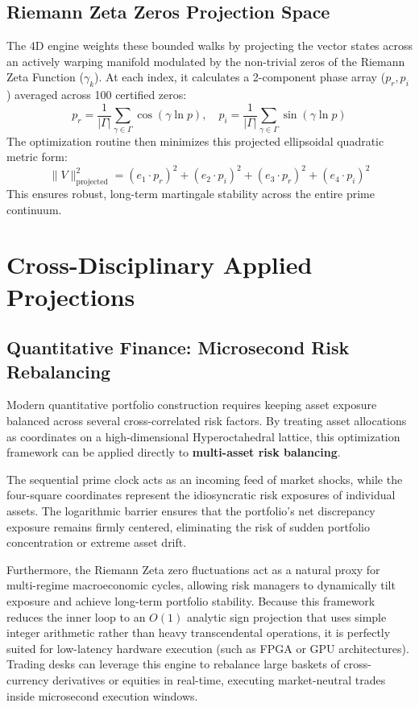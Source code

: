 \documentclass[11pt,a4paper]{article}
\begin{document}
\subsection{Riemann Zeta Zeros Projection Space}
The 4D engine weights these bounded walks by projecting the vector states across an actively warping manifold modulated by the non-trivial zeros of the Riemann Zeta Function ($\gamma_k$). At each index, it calculates a 2-component phase array ($p_{r}, p_{i}$) averaged across 100 certified zeros:
\begin{equation}
p_r = \frac{1}{|\Gamma|} \sum_{\gamma \in \Gamma} \cos(\gamma \ln p), \quad p_i = \frac{1}{|\Gamma|} \sum_{\gamma \in \Gamma} \sin(\gamma \ln p)
\end{equation}
The optimization routine then minimizes this projected ellipsoidal quadratic metric form:
\begin{equation}
\|V\|_{\text{projected}}^2 = (e_1 \cdot p_r)^2 + (e_2 \cdot p_i)^2 + (e_3 \cdot p_r)^2 + (e_4 \cdot p_i)^2
\end{equation}
This ensures robust, long-term martingale stability across the entire prime continuum.

\section{Cross-Disciplinary Applied Projections}

\subsection{Quantitative Finance: Microsecond Risk Rebalancing}
Modern quantitative portfolio construction requires keeping asset exposure balanced across several cross-correlated risk factors. By treating asset allocations as coordinates on a high-dimensional Hyperoctahedral lattice, this optimization framework can be applied directly to \textbf{multi-asset risk balancing}. 

The sequential prime clock acts as an incoming feed of market shocks, while the four-square coordinates represent the idiosyncratic risk exposures of individual assets. The logarithmic barrier ensures that the portfolio's net discrepancy exposure remains firmly centered, eliminating the risk of sudden portfolio concentration or extreme asset drift. 

Furthermore, the Riemann Zeta zero fluctuations act as a natural proxy for multi-regime macroeconomic cycles, allowing risk managers to dynamically tilt exposure and achieve long-term portfolio stability. Because this framework reduces the inner loop to an $O(1)$ analytic sign projection that uses simple integer arithmetic rather than heavy transcendental operations, it is perfectly suited for low-latency hardware execution (such as FPGA or GPU architectures). Trading desks can leverage this engine to rebalance large baskets of cross-currency derivatives or equities in real-time, executing market-neutral trades inside microsecond execution windows.
\end{document}
